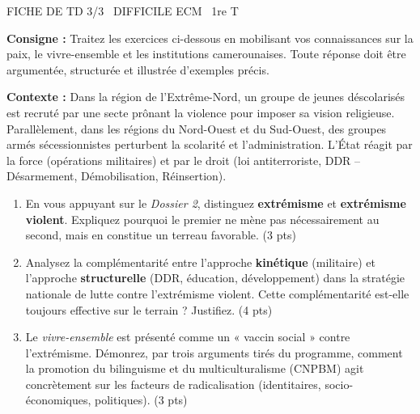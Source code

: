\documentclass[11pt]{article}
\begin{document}
\begin{tcolorbox}[enhanced,colback=popink,colframe=popink,arc=10pt,boxrule=0pt,left=12pt,right=12pt,top=9pt,bottom=9pt]
{\color{white}\popxbold\small FICHE DE TD 3/3 \textbullet\ DIFFICILE \hfill ECM \textbullet\ 1re T\par}
\end{tcolorbox}
\vspace{4pt}
\noindent \textbf{Consigne :} Traitez les exercices ci-dessous en mobilisant vos connaissances sur la paix, le vivre-ensemble et les institutions camerounaises. Toute réponse doit être argumentée, structurée et illustrée d'exemples précis.

\begin{exercice}
\textbf{Contexte :} Dans la région de l'Extrême-Nord, un groupe de jeunes déscolarisés est recruté par une secte prônant la violence pour imposer sa vision religieuse. Parallèlement, dans les régions du Nord-Ouest et du Sud-Ouest, des groupes armés sécessionnistes perturbent la scolarité et l'administration. L'État réagit par la force (opérations militaires) et par le droit (loi antiterroriste, DDR -- Désarmement, Démobilisation, Réinsertion).

\begin{enumerate}
    \item En vous appuyant sur le \textit{Dossier 2}, distinguez \textbf{extrémisme} et \textbf{extrémisme violent}. Expliquez pourquoi le premier ne mène pas nécessairement au second, mais en constitue un terreau favorable. (3 pts)
    \item Analysez la complémentarité entre l'approche \textbf{kinétique} (militaire) et l'approche \textbf{structurelle} (DDR, éducation, développement) dans la stratégie nationale de lutte contre l'extrémisme violent. Cette complémentarité est-elle toujours effective sur le terrain ? Justifiez. (4 pts)
    \item Le \textit{vivre-ensemble} est présenté comme un « vaccin social » contre l'extrémisme. Démonrez, par trois arguments tirés du programme, comment la promotion du bilinguisme et du multiculturalisme (CNPBM) agit concrètement sur les facteurs de radicalisation (identitaires, socio-économiques, politiques). (3 pts)
\end{enumerate}
\end{exercice}
\end{document}
